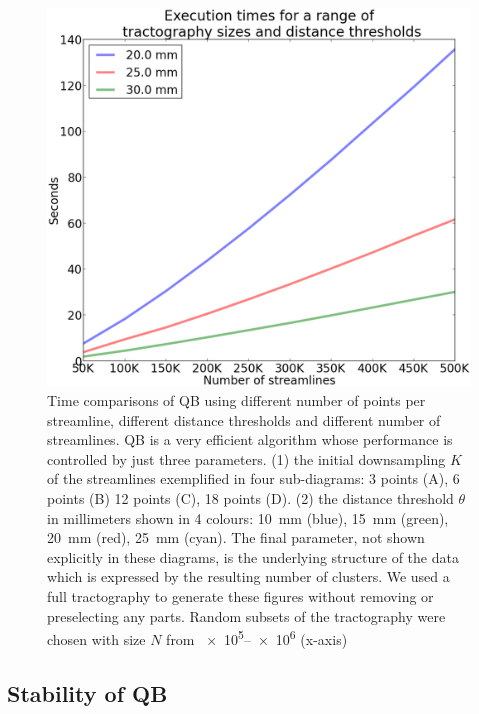 \documentclass{bioinfo}
\begin{document}
\begin{figure}
\noindent \begin{centering}
\includegraphics[scale=0.3]{Figures/Fig_3_timings}
\par\end{centering}
\caption{Time comparisons of QB using different number of points per
  streamline, different distance thresholds and different number of
  streamlines. QB is a very efficient algorithm whose performance is
  controlled by just three parameters. (1) the initial downsampling $K$
  of the streamlines exemplified in four sub-diagrams: 3 points (A), 6
  points (B) 12 points (C), 18 points (D). (2) the distance threshold
  $\theta$ in millimeters shown in 4 colours: 10~mm (blue), 15~mm
  (green), 20~mm (red), 25~mm (cyan). The final parameter, not shown
  explicitly in these diagrams, is the underlying structure of the data
  which is expressed by the resulting number of clusters.  We used a
  full tractography to generate these figures without removing or
  preselecting any parts. Random subsets of the tractography were chosen
  with size $N$ from \numrange{e5}{e6} (x-axis)\label{Flo:Speed1}}
\end{figure}

\subsection{Stability of QB\label{sub:Comparisons}}
\end{document}
